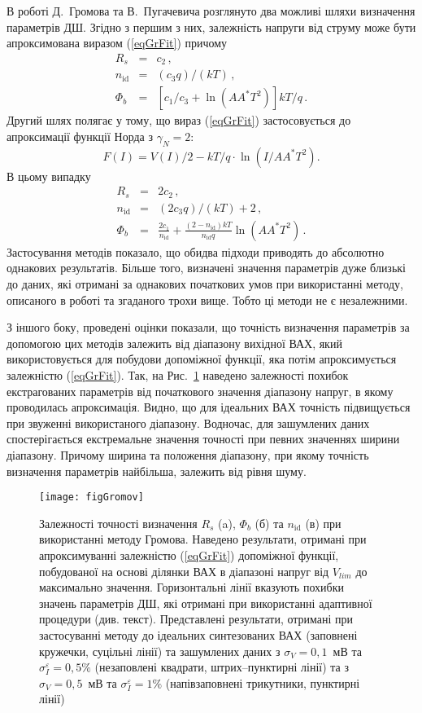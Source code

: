 \documentclass[a4paper,14pt,oneside,openany]{memoir}
\begin{document}
В роботі Д.~Громова та В.~Пугачевича \cite{Gromov} розглянуто два можливі шляхи визначення параметрів ДШ.
Згідно з першим з них, залежність напруги від струму може бути апроксимована виразом (\ref{eqGrFit}) причому
\begin{eqnarray}
\label{eqGr1}
R_s&=&c_2\,,
\\
n_\mathrm{id}&=&(c_3q)/(kT)\,,
\\
\Phi_b&=&\left[c_1/c_3+\ln\left(AA^*T^2\right)\right]kT/q\,.
\end{eqnarray}
Другий шлях полягає у тому, що вираз (\ref{eqGrFit}) застосовується до апроксимації функції Норда з $\gamma_N=2$:
\begin{equation}
\label{eqGr2}
F(I)=V(I)/2-kT/q\cdot\ln(I/AA^*T^2).
\end{equation}
В цьому випадку \cite{Gromov}
\begin{eqnarray}
\label{eqGr2Det}
R_s&=&2c_2\,,
\\
n_\mathrm{id}&=&(2c_3q)/(kT)+2\,,
\\
\Phi_b&=&\frac{2c_1}{n_\mathrm{id}}+\frac{(2-n_\mathrm{id})kT}{n_\mathrm{id}q}\ln\left(AA^*T^2\right)\,.
\end{eqnarray}
Застосування методів показало, що обидва підходи приводять до абсолютно однакових результатів.
Більше того, визначені значення параметрів дуже близькі до даних, які отримані за однакових початкових умов при використанні методу, описаного в роботі \cite{Lee} та згаданого трохи вище.
Тобто ці методи не є незалежними.

З іншого боку, проведені оцінки показали, що точність визначення параметрів за допомогою цих методів залежить від діапазону вихідної ВАХ, який використовується для побудови допоміжної функції, яка потім апроксимується залежністю (\ref{eqGrFit}).
Так, на Рис.~\ref{figGromov} наведено залежності похибок екстрагованих параметрів від початкового значення діапазону напруг, в якому проводилась апроксимація.
Видно, що для ідеальних ВАХ точність підвищується при звуженні використаного діапазону.
Водночас, для зашумлених даних спостерігається екстремальне значення точності  при певних значеннях ширини діапазону.
Причому ширина та положення діапазону, при якому точність визначення параметрів найбільша, залежить від рівня шуму.



\begin{figure}
\center
\texttt{[image: figGromov]}%
\caption{\label{figGromov}
Залежності точності визначення $R_s$ (a), $\Phi_b$ (б) та $n_\mathrm{id}$ (в) при використанні методу Громова.
Наведено результати, отримані при апроксимуванні залежністю (\ref{eqGrFit}) допоміжної функції, побудованої
на основі ділянки ВАХ в діапазоні напруг від $V_{lim}$ до максимально значення.
Горизонтальні лінії вказують похибки значень параметрів ДШ, які отримані при використанні адаптивної процедури (див. текст).
Представлені результати, отримані при застосуванні методу до ідеальних синтезованих ВАХ (заповнені кружечки, суцільні лінії) та зашумлених даних
з $\sigma_V=0,1$~мВ та $\sigma_I^\varepsilon=0,5\%$ (незаповлені квадрати, штрих--пунктирні лінії) та з $\sigma_V=0,5$~мВ та $\sigma_I^\varepsilon=1\%$
(напівзаповнені трикутники, пунктирні лінії)
}
\end{figure}
\end{document}
